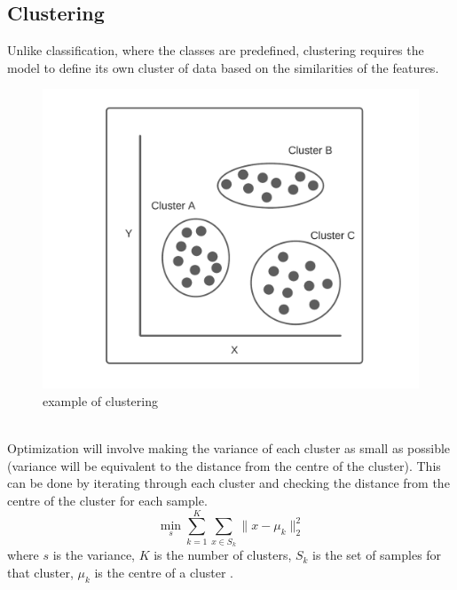 \documentclass[10pt,a4paper]{report}
\begin{document}
				\subsection{Clustering}
					Unlike classification, where the classes are predefined, clustering requires the model to define its own cluster of data
					based on the similarities of the features.
					\begin{figure}[h]
						\centering
						\includegraphics[scale=0.7]{clustering-diagram.png}
						\caption{example of clustering}
						\label{fig:clustering}
					\end{figure} \\
					Optimization will involve making the variance of each cluster as small as possible (variance will
					be equivalent to the distance from the centre of the cluster). This can be done by iterating through each cluster
					and checking the distance from the centre of the cluster for each sample.
					\begin{equation}
						\min_s \sum_{k=1}^{K} \sum_{x\in S_k} \| x - \mu_k \|_{2}^{2}
						\label{eq:unsupervised-learning-clustering}
					\end{equation}
					where $s$ is the variance, $K$ is the number of clusters, $S_k$ is the set of samples for that cluster,
					$\mu_k$ is the centre of a cluster \autocite[p. 3-4]{SurveyOfOptimizationMethods}.
\end{document}
